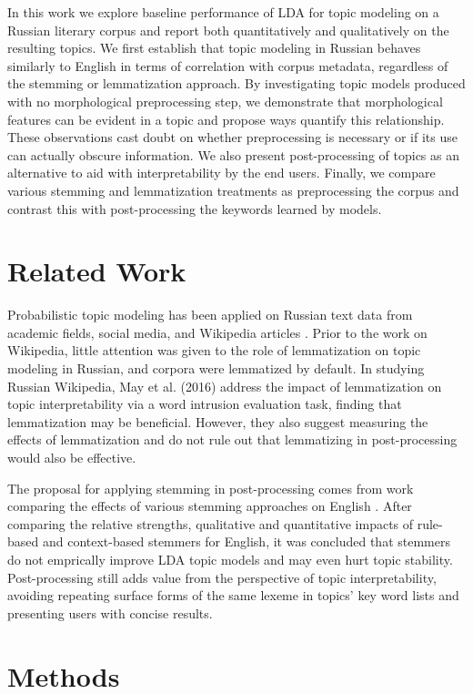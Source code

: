 \documentclass[11pt,a4paper]{article}
\begin{document}
In this work we explore baseline performance of LDA for topic modeling on a Russian literary corpus and report both quantitatively and qualitatively on the resulting topics. We first establish that topic modeling in Russian behaves similarly to English in terms of correlation with corpus metadata, regardless of the stemming or lemmatization approach. By investigating topic models produced with no morphological preprocessing step, we demonstrate that morphological features can be evident in a topic and propose ways quantify this relationship. These observations cast doubt on whether preprocessing is necessary or if its use can actually obscure information. We also present post-processing of topics as an alternative to aid with interpretability by the end users. Finally, we compare various stemming and lemmatization treatments as preprocessing the corpus and contrast this with post-processing the keywords learned by models.

\section{Related Work}
Probabilistic topic modeling has been applied on Russian text data from academic fields, social media, and Wikipedia articles \cite{mitrofanova2015probabilistic,koltsova2013,May2016AnAO}. Prior to the work on Wikipedia, little attention was given to the role of lemmatization on topic modeling in Russian, and corpora were lemmatized by default. In studying Russian Wikipedia, May et al. (2016) address the impact of lemmatization on topic interpretability via a word intrusion evaluation task, finding that lemmatization may be beneficial. However, they also suggest measuring the effects of lemmatization and do not rule out that lemmatizing in post-processing would also be effective.

The proposal for applying stemming in post-processing comes from work comparing the effects of various stemming approaches on English \cite{schofield-mimno-2016-comparing}. After comparing the relative strengths, qualitative and quantitative impacts of rule-based and context-based stemmers for English, it was concluded that stemmers do not emprically improve LDA topic models and may even hurt topic stability. Post-processing still adds value from the perspective of topic interpretability, avoiding repeating surface forms of the same lexeme in topics' key word lists and presenting users with concise results.


\section{Methods}
\end{document}
